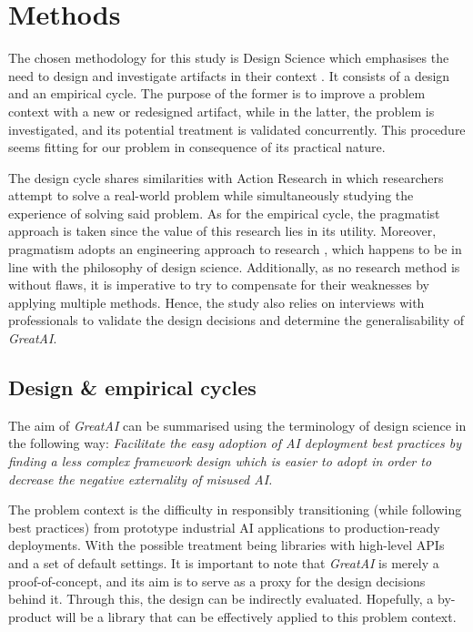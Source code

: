 \chapter{Methods} \label{chapter:methods}

The chosen methodology for this study is Design Science which emphasises the need to design and investigate artifacts in their context \cite{wieringa2014design}. It consists of a design and an empirical cycle. The purpose of the former is to improve a problem context with a new or redesigned artifact, while in the latter, the problem is investigated, and its potential treatment is validated concurrently. This procedure seems fitting for our problem in consequence of its practical nature.

The design cycle shares similarities with Action Research \cite{davison2004principles} in which researchers attempt to solve a real-world problem while simultaneously studying the experience of solving said problem. As for the empirical cycle, the pragmatist approach is taken since the value of this research lies in its utility. Moreover, pragmatism adopts an engineering approach to research \cite{shull2007guide}, which happens to be in line with the philosophy of design science. Additionally, as no research method is without flaws, it is imperative to try to compensate for their weaknesses by applying multiple methods. Hence, the study also relies on interviews with professionals to validate the design decisions and determine the generalisability of \textit{GreatAI}.

\section{Design \& empirical cycles}

The aim of \textit{GreatAI} can be summarised using the terminology of design science in the following way: 
\textit{Facilitate the easy adoption of AI deployment best practices
by finding a less complex framework design 
which is easier to adopt
in order to decrease the negative externality of misused AI.}

The problem context is the difficulty in responsibly transitioning (while following best practices) from prototype industrial AI applications to production-ready deployments. With the possible treatment being libraries with high-level APIs and a set of default settings. It is important to note that \textit{GreatAI} is merely a proof-of-concept, and its aim is to serve as a proxy for the design decisions behind it. Through this, the design can be indirectly evaluated. Hopefully, a by-product will be a library that can be effectively applied to this problem context.

